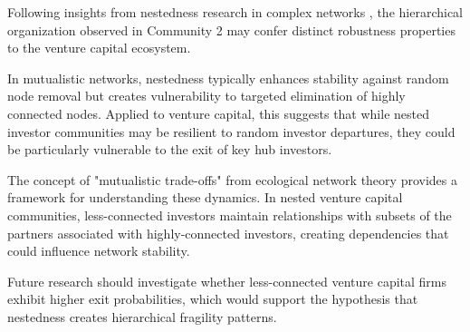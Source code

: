 Following insights from nestedness research in complex networks \cite{Mariani2019}, the hierarchical organization observed in Community 2 may confer distinct robustness properties to the venture capital ecosystem. 

In mutualistic networks, nestedness typically enhances stability against random node removal but creates vulnerability to targeted elimination of highly connected nodes. Applied to venture capital, this suggests that while nested investor communities may be resilient to random investor departures, they could be particularly vulnerable to the exit of key hub investors.

The concept of "mutualistic trade-offs" from ecological network theory provides a framework for understanding these dynamics. In nested venture capital communities, less-connected investors maintain relationships with subsets of the partners associated with highly-connected investors, creating dependencies that could influence network stability. 

Future research should investigate whether less-connected venture capital firms exhibit higher exit probabilities, which would support the hypothesis that nestedness creates hierarchical fragility patterns.
